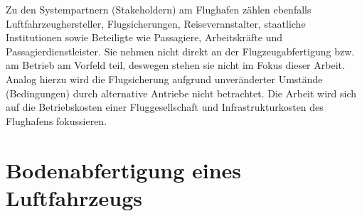 Zu den Systempartnern (Stakeholdern) am Flughafen zählen ebenfalls Luftfahrzeughersteller, Flugsicherungen, 
Reiseveranstalter, staatliche Institutionen \cite{maertens2023neue}
sowie Beteiligte wie Passagiere, Arbeitskräfte und Passagierdienstleister. 
Sie nehmen nicht direkt an der Flugzeugabfertigung bzw. am Betrieb am Vorfeld teil, 
deswegen stehen sie nicht im Fokus dieser Arbeit.
Analog hierzu wird die Flugsicherung aufgrund unveränderter Umstände (Bedingungen) 
durch alternative Antriebe nicht betrachtet. 
Die Arbeit wird sich auf die Betriebskosten einer Fluggesellschaft 
und Infrastrukturkosten des Flughafens fokussieren.
%
%
%
%
%
%
%
%
\section{Bodenabfertigung eines Luftfahrzeugs}
\label{s:Bodenabfertigung eines Luftfahrzeugs}


